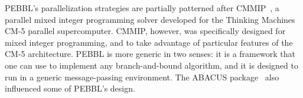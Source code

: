 PEBBL's parallelization strategies are partially patterned after
CMMIP~\cite{Eck94,Eck97}, a parallel mixed integer programming solver
developed for the Thinking Machines CM-5 parallel supercomputer.
CMMIP, however, was specifically designed for mixed integer
programming, and to take advantage of particular features of the CM-5
architecture.  PEBBL is more generic in two senses: it is a framework that
one can use to implement any branch-and-bound algorithm, and it is
designed to run in a generic message-passing environment.  The ABACUS
package~\cite{JT98} also influenced some of PEBBL's design.
